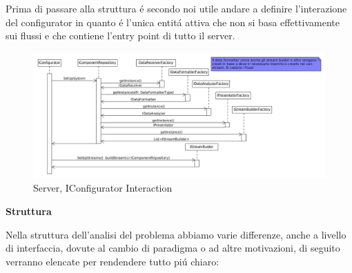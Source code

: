 Prima di passare alla struttura \'e secondo noi utile andare a definire l'interazione del configurator in quanto \'e l'unica entit\'a attiva che non si basa effettivamente sui flussi e che contiene l'entry point di tutto il server.

\begin{figure}[h]
\centering
\includegraphics[width=\textwidth]{Figures/LogicArchitecture/Server/IConfiguratorInteraction}
\caption{Server, IConfigurator Interaction}
\end{figure}

\newpage

\begin{center}
\textbf{Struttura}
\end{center}

Nella struttura dell'analisi del problema abbiamo varie differenze, anche a livello di interfaccia, dovute al cambio di paradigma o ad altre motivazioni, di seguito verranno elencate per rendendere tutto pi\'u chiaro:

